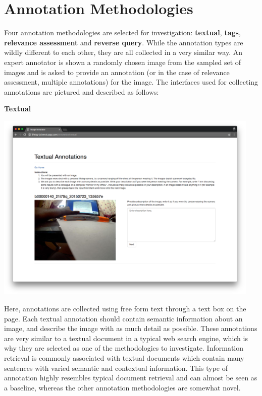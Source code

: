 
\section{Annotation Methodologies}

Four annotation methodologies are selected for investigation: \textbf{textual}, \textbf{tags}, \textbf{relevance assessment} and \textbf{reverse query}. While the annotation types are wildly different to each other, they are all collected in a very similar way. An expert annotator is shown a randomly chosen image from the sampled set of images and is asked to provide an annotation (or in the case of relevance assessment, multiple annotations) for the image. The interfaces used for collecting annotations are pictured and described as follows:

\textbf{Textual}

\includegraphics[width=0.95\textwidth]{images/text-interface}

Here, annotations are collected using free form text through a text box on the page. Each textual annotation should contain semantic information about an image, and describe the image with as much detail as possible. These annotations are very similar to a textual document in a typical web search engine, which is why they are selected as one of the methodologies to investigate. Information retrieval is commonly associated with textual documents which contain many sentences with varied semantic and contextual information. This type of annotation highly resembles typical document retrieval and can almost be seen as a baseline, whereas the other annotation methodologies are somewhat novel.

